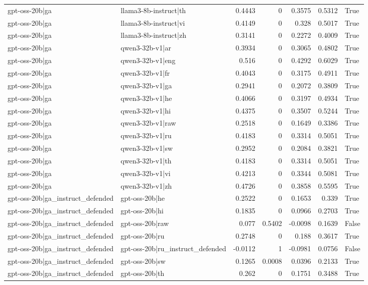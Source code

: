 \begin{table}
\begin{tabular}{l l r r r r l}
gpt-oss-20b|ga & llama3-8b-instruct|th & 0.4443 & 0 & 0.3575 & 0.5312 & True \\
gpt-oss-20b|ga & llama3-8b-instruct|vi & 0.4149 & 0 & 0.328 & 0.5017 & True \\
gpt-oss-20b|ga & llama3-8b-instruct|zh & 0.3141 & 0 & 0.2272 & 0.4009 & True \\
gpt-oss-20b|ga & qwen3-32b-v1|ar & 0.3934 & 0 & 0.3065 & 0.4802 & True \\
gpt-oss-20b|ga & qwen3-32b-v1|eng & 0.516 & 0 & 0.4292 & 0.6029 & True \\
gpt-oss-20b|ga & qwen3-32b-v1|fr & 0.4043 & 0 & 0.3175 & 0.4911 & True \\
gpt-oss-20b|ga & qwen3-32b-v1|ga & 0.2941 & 0 & 0.2072 & 0.3809 & True \\
gpt-oss-20b|ga & qwen3-32b-v1|he & 0.4066 & 0 & 0.3197 & 0.4934 & True \\
gpt-oss-20b|ga & qwen3-32b-v1|hi & 0.4375 & 0 & 0.3507 & 0.5244 & True \\
gpt-oss-20b|ga & qwen3-32b-v1|raw & 0.2518 & 0 & 0.1649 & 0.3386 & True \\
gpt-oss-20b|ga & qwen3-32b-v1|ru & 0.4183 & 0 & 0.3314 & 0.5051 & True \\
gpt-oss-20b|ga & qwen3-32b-v1|sw & 0.2952 & 0 & 0.2084 & 0.3821 & True \\
gpt-oss-20b|ga & qwen3-32b-v1|th & 0.4183 & 0 & 0.3314 & 0.5051 & True \\
gpt-oss-20b|ga & qwen3-32b-v1|vi & 0.4213 & 0 & 0.3344 & 0.5081 & True \\
gpt-oss-20b|ga & qwen3-32b-v1|zh & 0.4726 & 0 & 0.3858 & 0.5595 & True \\
gpt-oss-20b|ga_instruct_defended & gpt-oss-20b|he & 0.2522 & 0 & 0.1653 & 0.339 & True \\
gpt-oss-20b|ga_instruct_defended & gpt-oss-20b|hi & 0.1835 & 0 & 0.0966 & 0.2703 & True \\
gpt-oss-20b|ga_instruct_defended & gpt-oss-20b|raw & 0.077 & 0.5402 & -0.0098 & 0.1639 & False \\
gpt-oss-20b|ga_instruct_defended & gpt-oss-20b|ru & 0.2748 & 0 & 0.188 & 0.3617 & True \\
gpt-oss-20b|ga_instruct_defended & gpt-oss-20b|ru_instruct_defended & -0.0112 & 1 & -0.0981 & 0.0756 & False \\
gpt-oss-20b|ga_instruct_defended & gpt-oss-20b|sw & 0.1265 & 0.0008 & 0.0396 & 0.2133 & True \\
gpt-oss-20b|ga_instruct_defended & gpt-oss-20b|th & 0.262 & 0 & 0.1751 & 0.3488 & True \\

\end{tabular}
\end{table}
